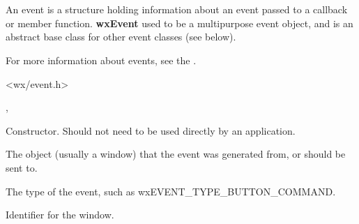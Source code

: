 \section{}\label{wxevent}

An event is a structure holding information about an event passed to a
callback or member function. {\bf wxEvent} used to be a multipurpose
event object, and is an abstract base class for other event classes (see below).

For more information about events, see the .





<wx/event.h>


,\rtfsp
{}


\label{wxeventctor}


Constructor. Should not need to be used directly by an application.

\label{wxeventmeventobject}


The object (usually a window) that the event was generated from,
or should be sent to.

\label{wxeventmeventtype}


The type of the event, such as wxEVENT\_TYPE\_BUTTON\_COMMAND.

\label{wxeventmid}


Identifier for the window.

\label{wxeventmpropagationlevel}

